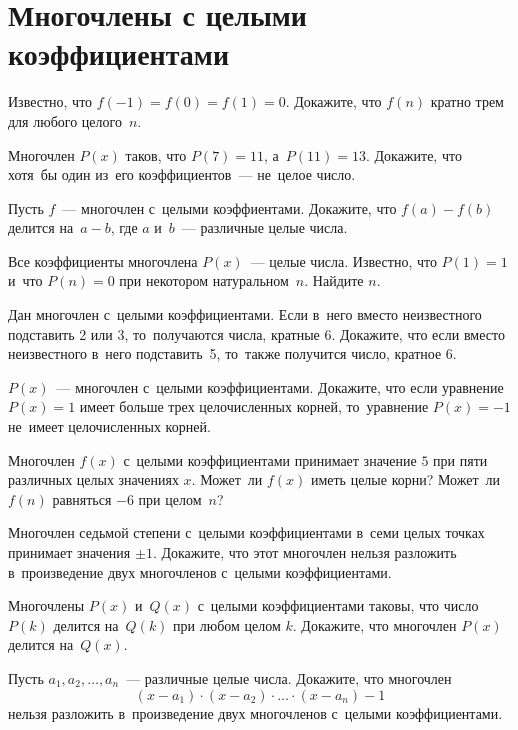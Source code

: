 
\section*{Многочлены с целыми коэффициентами}


\begin{problems}

\item
Известно, что $f(-1) = f(0) = f(1) = 0$.
Докажите, что $f(n)$ кратно трем для любого целого~$n$.

\item
Многочлен $P(x)$ таков, что $P(7) = 11$, а~$P(11) = 13$.
Докажите, что хотя~бы один из~его коэффициентов~— не~целое число.

\item
Пусть $f$~— многочлен с~целыми коэффиентами.
Докажите, что $f(a) - f(b)$ делится на~$a - b$, где $a$ и~$b$~— различные
целые числа.

\item
Все коэффициенты многочлена $P(x)$~— целые числа.
Известно, что $P(1) = 1$ и~что $P(n) = 0$ при некотором натуральном~$n$.
Найдите $n$.

\item
Дан многочлен с~целыми коэффициентами.
Если в~него вместо неизвестного подставить 2 или 3, то~получаются числа,
кратные 6.
Докажите, что если вместо неизвестного в~него подставить~5, то~также получится
число, кратное 6.

\item
$P(x)$~— многочлен с~целыми коэффициентами.
Докажите, что если уравнение $P(x) = 1$ имеет больше трех целочисленных корней,
то~уравнение $P(x) = -1$ не~имеет целочисленных корней.

\item
Многочлен $f(x)$ с~целыми коэффициентами принимает значение $5$ при пяти
различных целых значениях $x$.
Может~ли $f(x)$ иметь целые корни?
Может~ли $f(n)$ равняться $-6$ при целом~$n$?

\item
Многочлен седьмой степени с~целыми коэффициентами в~семи целых точках принимает
значения $\pm 1$.
Докажите, что этот многочлен нельзя разложить в~произведение двух многочленов
с~целыми коэффициентами.

\item
Многочлены $P(x)$ и~$Q(x)$ с~целыми коэффициентами таковы, что число $P(k)$
делится на~$Q(k)$ при любом целом $k$.
Докажите, что многочлен $P(x)$ делится на~$Q(x)$.

\item
Пусть $a_1, a_2, \ldots, a_n$~— различные целые числа.
Докажите, что многочлен
\[
    (x - a_1) \cdot (x - a_2) \cdot \ldots \cdot (x - a_n) - 1
\]
нельзя разложить в~произведение двух многочленов с~целыми коэффициентами.

\end{problems}

